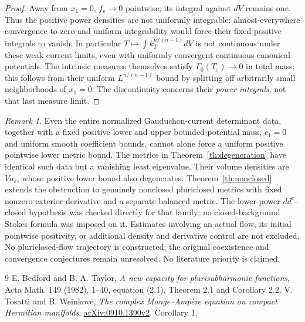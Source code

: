 \documentclass[11pt]{article}
\theoremstyle{remark}\newtheorem{remark}[theorem]{Remark}
\begin{document}
\begin{proof}
Away from $x_1=0$, $f_\varepsilon\to0$ pointwise; its integral
against $dV$ remains one. Thus the positive power densities are not
uniformly integrable: almost-everywhere convergence to zero and
uniform integrability would force their fixed positive integrals to
vanish. In particular $T\mapsto\int k_T^{n/(n-1)}dV$ is not
continuous under these weak current limits, even with uniformly
convergent continuous canonical potentials. The intrinsic measures
themselves satisfy $\Gamma_0(T_\varepsilon)\to0$ in total mass;
this follows from their uniform $L^{n/(n-1)}$ bound by splitting
off arbitrarily small neighborhoods of $x_1=0$. The discontinuity
concerns their \emph{power integrals}, not that last measure limit.
\end{proof}

\begin{remark}
Even the entire normalized Gauduchon-current determinant data,
together with a fixed positive lower and upper bounded-potential mass,
$c_1=0$ and uniform smooth coefficient bounds,
cannot alone force a uniform positive pointwise lower metric bound.
The metrics in Theorem~\ref{th:degeneration} have identical such data but a vanishing least
eigenvalue. Their volume densities are $Va_\varepsilon$, whose
positive lower bound also degenerates. Theorem~\ref{th:nonclosed}
extends the obstruction to genuinely nonclosed pluriclosed metrics
with fixed nonzero exterior derivative and a separate balanced metric.
The lower-power $dd^c$-closed hypothesis was checked directly for that
family; no closed-background Stokes formula was imposed on it.
Estimates involving an
actual flow, its initial pointwise positivity, or additional density
and derivative control are not excluded. No pluriclosed-flow
trajectory is constructed; the original coexistence and convergence
conjectures remain unresolved. No literature priority is claimed.
\end{remark}
\begin{thebibliography}{9}
 E. Bedford and B. A. Taylor,
\emph{A new capacity for plurisubharmonic functions}, Acta Math.
149 (1982), 1--40, equation (2.1), Theorem 2.1 and Corollary 2.2.
 V. Tosatti and B. Weinkove,
\emph{The complex Monge--Amp\`ere equation on compact Hermitian
manifolds}, \href{https://arxiv.org/abs/0910.1390v2}{arXiv:0910.1390v2},
Corollary 1.
\end{thebibliography}
\end{document}
